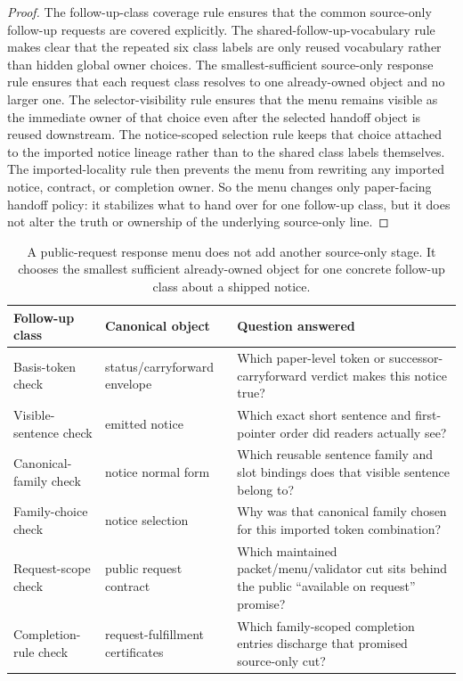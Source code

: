 \documentclass[11pt]{article}
\begin{document}
\begin{proof}
The follow-up-class coverage rule ensures that the common source-only follow-up requests are covered explicitly.
The shared-follow-up-vocabulary rule makes clear that the repeated six class labels are only reused vocabulary rather than hidden global owner choices.
The smallest-sufficient source-only response rule ensures that each request class resolves to one already-owned object and no larger one.
The selector-visibility rule ensures that the menu remains visible as the immediate owner of that choice even after the selected handoff object is reused downstream.
The notice-scoped selection rule keeps that choice attached to the imported notice lineage rather than to the shared class labels themselves.
The imported-locality rule then prevents the menu from rewriting any imported notice, contract, or completion owner.
So the menu changes only paper-facing handoff policy: it stabilizes what to hand over for one follow-up class, but it does not alter the truth or ownership of the underlying source-only line.\qedhere
\end{proof}

\begin{table}[t]
\centering
\small
\begin{tabularx}{\linewidth}{@{}l l X@{}}
\toprule
Follow-up class & Canonical object & Question answered \\
\midrule
Basis-token check & status/carryforward envelope & Which paper-level token or successor-carryforward verdict makes this notice true? \\
Visible-sentence check & emitted notice & Which exact short sentence and first-pointer order did readers actually see? \\
Canonical-family check & notice normal form & Which reusable sentence family and slot bindings does that visible sentence belong to? \\
Family-choice check & notice selection & Why was that canonical family chosen for this imported token combination? \\
Request-scope check & public request contract & Which maintained packet/menu/validator cut sits behind the public ``available on request'' promise? \\
Completion-rule check & request-fulfillment certificates & Which family-scoped completion entries discharge that promised source-only cut? \\
\bottomrule
\end{tabularx}
\caption{A public-request response menu does not add another source-only stage. It chooses the smallest sufficient already-owned object for one concrete follow-up class about a shipped notice.}
\label{tab:publicrequestresponsemenu}
\end{table}
\end{document}

